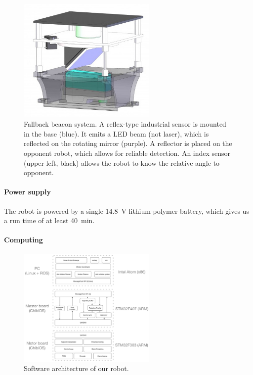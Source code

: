 \documentclass[a4paper]{paper}
\begin{document}
\begin{figure}[h]
    \begin{center}
        \includegraphics[width=0.6\textwidth]{images/Balise}
        \caption{Fallback beacon system.
            A reflex-type industrial sensor is mounted in the base (blue).
            It emits a LED beam (not laser), which is reflected on the rotating mirror (purple).
            A reflector is placed on the opponent robot, which allows for reliable detection.
            An index sensor (upper left, black) allows the robot to know the relative angle to opponent.
        }
        \label{fig:balise}
    \end{center}
\end{figure}

\paragraph{Power supply}
The robot is powered by a single \SI{14.8}{\volt} lithium-polymer battery, which gives us a run time of at least \SI{40}{\minute}.

\paragraph{Computing}
\begin{figure}[h]
    \begin{center}
        \includegraphics[width=0.6\textwidth]{images/software}
        \caption{Software architecture of our robot.}
        \label{fig:software}
    \end{center}
\end{figure}
\end{document}
